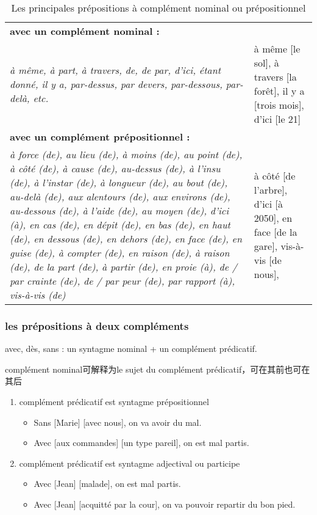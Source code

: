 \documentclass[UTF8]{report}
\begin{document}
\begin{table}[H]
\begin{tabular}{|>{\raggedright\arraybackslash}p{}|>{\raggedright\arraybackslash}p{}|}
        \multicolumn{2}{|c|}{\cellcolor[HTML]{F2F2F2}\textbf{COMPLEXES}} \\ %
        \hline
        \textbf{avec un complément nominal :} & \\
        \textit{à même, à part, à travers, de, de par, d'ici, étant donné, il y a, par-dessus, par devers, par-dessous, par-delà, etc.} & à même [le sol], à travers [la forêt], il y a [trois mois], d'ici [le 21] \\
        \hline
        \textbf{avec un complément prépositionnel :} & \\
        \textit{à force (de), au lieu (de), à moins (de), au point (de), à côté (de), à cause (de), au-dessus (de), à l'insu (de), à l'instar (de), à longueur (de), au bout (de), au-delà (de), aux alentours (de), aux environs (de), au-dessous (de), à l'aide (de), au moyen (de), d'ici (à), en cas (de), en dépit (de), en bas (de), en haut (de), en dessous (de), en dehors (de), en face (de), en guise (de), à compter (de), en raison (de), à raison (de), de la part (de), à partir (de), en proie (à), de / par crainte (de), de / par peur (de), par rapport (à), vis-à-vis (de)} & à côté [de l'arbre], d'ici [à 2050], en face [de la gare], vis-à-vis [de nous], \\
        \hline
    \end{tabular}
    \caption{Les principales prépositions à complément nominal ou prépositionnel}
\end{table}

\subsubsection{les prépositions à deux compléments}
avec, dès, sans : un syntagme nominal + un complément prédicatif. 

complément nominal可解释为le sujet du complément prédicatif，可在其前也可在其后
\begin{enumerate}
    \item complément prédicatif est syntagme prépositionnel
    \begin{itemize}
        \item Sans [Marie] [avec nous], on va avoir du mal.
        \item Avec [aux commandes] [un type pareil], on est mal partis.
    \end{itemize}
    \item complément prédicatif est syntagme adjectival ou participe
    \begin{itemize}
        \item Avec [Jean] [malade], on est mal partis.
        \item Avec [Jean] [acquitté par la cour], on va pouvoir repartir du bon pied.
    \end{itemize}
\end{enumerate}
\end{document}
